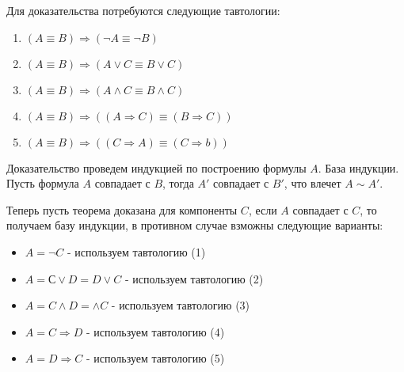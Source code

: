 \documentclass[a4paper,12pt]{article}
\begin{document}
\begin{Proof}

Для доказательства потребуются следующие тавтологии:

\begin{enumerate}
\item $\left(A \equiv B\right) \Rightarrow \left(\neg A \equiv \neg B\right)$

\item $\left(A \equiv B\right) \Rightarrow \left(A \vee C \equiv B \vee C\right)$

\item $\left(A \equiv B\right) \Rightarrow \left(A \wedge C \equiv B \wedge C\right)$

\item $\left(A \equiv B\right) \Rightarrow \left(\left(A \Rightarrow C\right) \equiv \left(B \Rightarrow C\right)\right)$

\item $\left(A \equiv B\right) \Rightarrow \left(\left(C \Rightarrow A\right) \equiv \left(C \Rightarrow b\right)\right)$
\end{enumerate}

Доказательство проведем индукцией по построению формулы $A$. База индукции. Пусть формула $A$ совпадает с $B$, тогда $A'$ совпадает с $B'$, что влечет $A \sim A'$.

Теперь пусть теорема доказана для компоненты $C$, если $A$ совпадает с $C$, то получаем базу индукции, в противном случае взможны следующие варианты:
\begin{itemize}
\item $A = \neg C$ - используем тавтологию (1)

\item $A = С \vee D = D \vee C$ - используем тавтологию (2)

\item $A = C \wedge D =  \wedge C$ - используем тавтологию (3)

\item $A = C \Rightarrow D$ - используем тавтологию (4)

\item $A = D \Rightarrow C$ - используем тавтологию (5)
\end{itemize}

\end{Proof}
\end{document}
